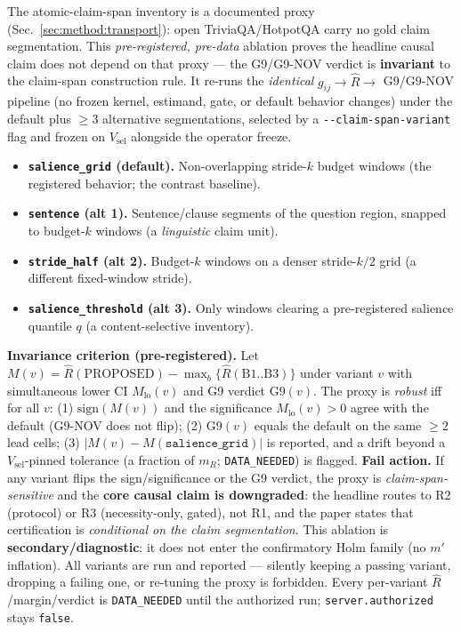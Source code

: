 \documentclass[11pt]{article}
\theoremstyle{plain}
\theoremstyle{definition}
\newcommand{\Rhat}{\widehat{R}}
\begin{document}
The atomic-claim-span inventory is a documented proxy
(Sec.~\ref{sec:method:transport}): open TriviaQA/HotpotQA carry no gold claim
segmentation. This \emph{pre-registered, pre-data} ablation proves the headline causal
claim does not depend on that proxy --- the G9/G9-NOV verdict is \textbf{invariant} to
the claim-span construction rule. It re-runs the \emph{identical}
$g_{ij}\!\to\!\Rhat\!\to$ G9/G9-NOV pipeline (no frozen kernel, estimand, gate, or
default behavior changes) under the default plus $\ge3$ alternative segmentations,
selected by a \texttt{-{}-claim-span-variant} flag and frozen on $V_{\mathrm{sel}}$
alongside the operator freeze.
\begin{itemize}[leftmargin=1.4em,itemsep=1pt]
  \item \textbf{\texttt{salience\_grid} (default).} Non-overlapping stride-$k$ budget
  windows (the registered behavior; the contrast baseline).
  \item \textbf{\texttt{sentence} (alt 1).} Sentence/clause segments of the question
  region, snapped to budget-$k$ windows (a \emph{linguistic} claim unit).
  \item \textbf{\texttt{stride\_half} (alt 2).} Budget-$k$ windows on a denser
  stride-$k/2$ grid (a different fixed-window stride).
  \item \textbf{\texttt{salience\_threshold} (alt 3).} Only windows clearing a
  pre-registered salience quantile $q$ (a content-selective inventory).
\end{itemize}
\textbf{Invariance criterion (pre-registered).} Let $M(v)=\Rhat(\text{PROPOSED})-\max_b\{\Rhat(\text{B1..B3})\}$
under variant $v$ with simultaneous lower CI $M_{\mathrm{lo}}(v)$ and G9 verdict
$\mathrm{G9}(v)$. The proxy is \emph{robust} iff for all
$v$: (1) $\mathrm{sign}(M(v))$ and the significance $M_{\mathrm{lo}}(v)>0$ agree with
the default (G9-NOV does not flip); (2) $\mathrm{G9}(v)$ equals the default on the same
$\ge2$ lead cells; (3) $|M(v)-M(\texttt{salience\_grid})|$ is reported, and a drift
beyond a $V_{\mathrm{sel}}$-pinned tolerance (a fraction of $m_R$; \texttt{DATA\_NEEDED})
is flagged. \textbf{Fail action.} If any variant flips the sign/significance or the G9
verdict, the proxy is \emph{claim-span-sensitive} and the \textbf{core causal claim is
downgraded}: the headline routes to R2 (protocol) or R3 (necessity-only, gated), not R1,
and the paper states that certification is \emph{conditional on the claim segmentation}.
This ablation is \textbf{secondary/diagnostic}: it does not enter the confirmatory Holm
family (no $m'$ inflation). All variants are run and reported --- silently keeping a
passing variant, dropping a failing one, or re-tuning the proxy is forbidden. Every
per-variant $\Rhat$/margin/verdict is \texttt{DATA\_NEEDED} until the authorized run;
\texttt{server.authorized} stays \texttt{false}.
\end{document}
